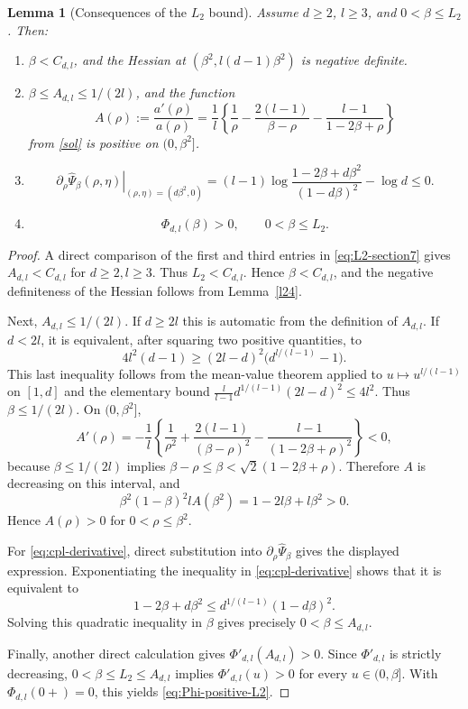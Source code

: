 \documentclass[11pt]{amsart}
\theoremstyle{plain}
\newtheorem{lemma}[theorem]{Lemma}
\numberwithin{equation}{section}
\numberwithin{theorem}{section}
\numberwithin{figure}{section}
\begin{document}
\begin{lemma}[Consequences of the $L_2$ bound]\label{lem:L2-elementary-consequences}
Assume $d\ge2$, $l\ge3$, and $0<\beta\le L_2$.  Then:
\begin{enumerate}
\item $\beta<C_{d,l}$, and the Hessian at
      $(\beta^2,l(d-1)\beta^2)$ is negative definite.
\item $\beta\le A_{d,l}\le 1/(2l)$, and the function
\[
  A(\rho):=\frac{a'(\rho)}{a(\rho)}
  =\frac1l\left\{\frac1\rho-
  \frac{2(l-1)}{\beta-\rho}-\frac{l-1}{1-2\beta+\rho}\right\}
\]
from \eqref{sol} is positive on $(0,\beta^2]$.
\item
\begin{equation}\label{eq:cpl-derivative}
  \left.\partial_\rho\widehat\Psi_\beta(\rho,\eta)\right|_{(\rho,\eta)=(d\beta^2,0)}
  =(l-1)\log\frac{1-2\beta+d\beta^2}{(1-d\beta)^2}-\log d\le0.
\end{equation}
\item
\begin{equation}\label{eq:Phi-positive-L2}
  \Phi_{d,l}(\beta)>0,
  \qquad 0<\beta\le L_2.
\end{equation}
\end{enumerate}
\end{lemma}

\begin{proof}
A direct comparison of the first and third entries in \eqref{eq:L2-section7}
gives $A_{d,l}<C_{d,l}$ for $d\ge2,l\ge3$.  Thus $L_2<C_{d,l}$.  Hence
$\beta<C_{d,l}$, and the negative definiteness of the Hessian follows from
Lemma~\ref{l24}.

Next, $A_{d,l}\le1/(2l)$.  If $d\ge2l$ this is automatic from the definition of
$A_{d,l}$.  If $d<2l$, it is equivalent, after squaring two positive quantities, to
\[
  4l^2(d-1)\ge (2l-d)^2\bigl(d^{l/(l-1)}-1\bigr).
\]
This last inequality follows from the mean-value theorem applied to
$u\mapsto u^{l/(l-1)}$ on $[1,d]$ and the elementary bound
$\frac{l}{l-1}d^{1/(l-1)}(2l-d)^2\le4l^2$.  Thus $\beta\le1/(2l)$.  On
$(0,\beta^2]$,
\[
  A'(\rho)=-\frac1l\left\{\frac1{\rho^2}+
  \frac{2(l-1)}{(\beta-\rho)^2}-\frac{l-1}{(1-2\beta+\rho)^2}\right\}<0,
\]
because $\beta\le1/(2l)$ implies
$\beta-\rho\le\beta<\sqrt2(1-2\beta+\rho)$.  Therefore $A$ is decreasing on this
interval, and
\[
  \beta^2(1-\beta)^2 l A(\beta^2)=1-2l\beta+l\beta^2>0.
\]
Hence $A(\rho)>0$ for $0<\rho\le\beta^2$.

For \eqref{eq:cpl-derivative}, direct substitution into
$\partial_\rho\widehat\Psi_\beta$ gives the displayed expression.  Exponentiating the
inequality in \eqref{eq:cpl-derivative} shows that it is equivalent to
\[
  1-2\beta+d\beta^2\le d^{1/(l-1)}(1-d\beta)^2 .
\]
Solving this quadratic inequality in $\beta$ gives precisely
$0<\beta\le A_{d,l}$.

Finally, another direct calculation gives $\Phi'_{d,l}(A_{d,l})>0$.  Since
$\Phi'_{d,l}$ is strictly decreasing, $0<\beta\le L_2\le A_{d,l}$ implies
$\Phi'_{d,l}(u)>0$ for every $u\in(0,\beta]$.  With
$\Phi_{d,l}(0+)=0$, this yields \eqref{eq:Phi-positive-L2}.
\end{proof}
\end{document}
